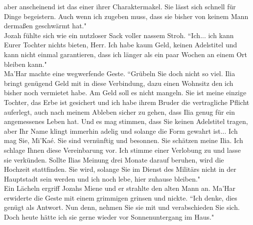 aber anscheinend ist das einer ihrer Charaktermakel. Sie lässt sich schnell für Dinge begeistern. 
Auch wenn ich zugeben muss, dass sie bisher von keinem Mann dermaßen geschwärmt hat."\\
Jozah fühlte sich wie ein nutzloser Sack voller nassem Stroh.  ``Ich... ich kann Eurer Tochter 
nichts bieten, Herr. Ich habe kaum Geld, keinen Adelstitel und kann nicht einmal garantieren, dass 
ich länger als ein paar Wochen an einem Ort bleiben kann."\\
Ma'Har machte eine wegwerfende Geste.  ``Grübeln Sie doch nicht so viel. Ilia bringt genügend Geld 
mit in diese Verbindung, dazu einen Wohnsitz den ich bisher noch vermietet habe. Am Geld soll es 
nicht mangeln. Sie ist meine einzige Tochter, das Erbe ist gesichert und ich habe ihrem Bruder die 
vertragliche Pflicht auferlegt, auch nach meinem Ableben sicher zu gehen, dass Ilia genug für ein 
angemessenes Leben hat. Und es mag stimmen, dass Sie keinen Adelstitel tragen, aber Ihr Name klingt 
immerhin adelig und solange die Form gewahrt ist... Ich mag Sie, Mi'Kaé. Sie sind vernünftig und 
besonnen. Sie schätzen meine Ilia. Ich schlage Ihnen diese Vereinbarung vor. Ich stimme einer 
Verlobung zu und lasse sie verkünden. Sollte Ilias Meinung drei Monate darauf beruhen, wird die 
Hochzeit stattfinden. Sie wird, solange Sie im Dienst des Militärs nicht in der Hauptstadt sein 
werden und ich noch lebe, hier zuhause bleiben."\\
Ein Lächeln ergriff Jozahs Miene und er strahlte den alten Mann an. Ma'Har erwiderte die Geste mit 
einem grimmigen grinsen und nickte.  ``Ich denke, dies genügt als Antwort. Nun denn, nehmen Sie sie 
mit und verabschieden Sie sich. Doch heute hätte ich sie gerne wieder vor Sonnenuntergang im 
Haus."\\